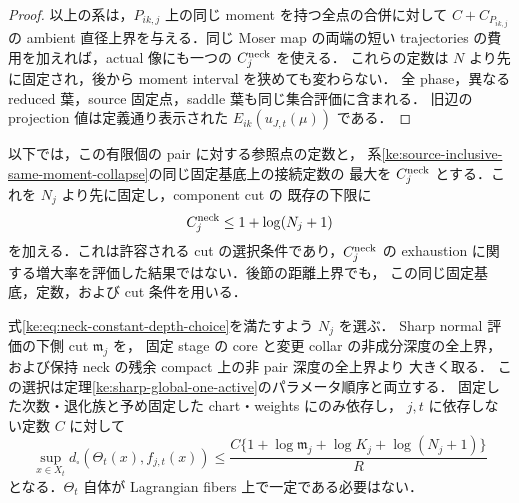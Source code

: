 \begin{proof}
以上の系は，$P_{ik,j}$ 上の同じ moment を持つ全点の合併に対して
$C+C_{P_{ik,j}}$ の ambient 直径上界を与える．同じ Moser map の両端の短い
trajectories の費用を加えれば，actual 像にも一つの $C_j^{\rm neck}$ を使える．
これらの定数は $N$ より先に固定され，後から moment interval を狭めても変わらない．
全 phase，異なる reduced 葉，source 固定点，saddle 葉も同じ集合評価に含まれる．
旧辺の projection 値は定義通り表示された $E_{ik}(u_{J,t}(\mu))$ である．
\end{proof}

以下では，この有限個の pair に対する参照点の定数と，
系\ref{ke:source-inclusive-same-moment-collapse}の同じ固定基底上の接続定数の
最大を $C_j^{\rm neck}$ とする．これを $N_j$ より先に固定し，component cut の
既存の下限に
\begin{equation}\label{ke:eq:neck-constant-depth-choice}
 C_j^{\rm neck}\le1+\log(N_j+1)
\end{equation}
を加える．これは許容される cut の選択条件であり，$C_j^{\rm neck}$ の
exhaustion に関する増大率を評価した結果ではない．後節の距離上界でも，
この同じ固定基底，定数，および cut 条件を用いる．

\begin{proposition}
\label{ke:global-depth-base-comparison}
式\eqref{ke:eq:neck-constant-depth-choice}を満たすよう $N_j$ を選ぶ．
Sharp normal 評価の下側 cut $\mathfrak m_j$ を，
固定 stage の core と変更 collar の非成分深度の全上界，
および保持 neck の残余 compact 上の非 pair 深度の全上界より
大きく取る．
この選択は定理\ref{ke:sharp-global-one-active}のパラメータ順序と両立する．
固定した次数・退化族と予め固定した chart・weights にのみ依存し，
$j,t$ に依存しない定数 $C$ に対して
\begin{equation}\label{ke:eq:global-depth-base-comparison}
 \sup_{x\in X_t}d_\square(\Theta_t(x),f_{j,t}(x))
 \le \frac{C\{1+\log\mathfrak m_j+\log K_j+\log(N_j+1)\}}R
\end{equation}
となる．$\Theta_t$ 自体が Lagrangian fibers 上で一定である必要はない．
\end{proposition}

